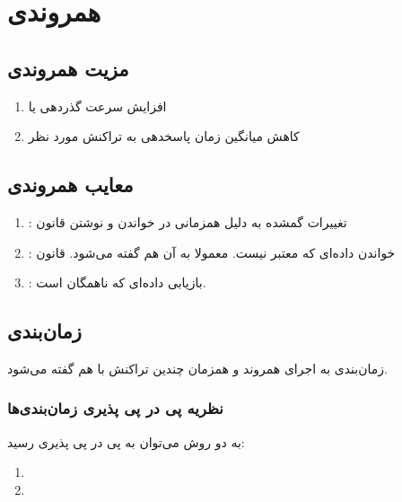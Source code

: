 \section{همروندی}

\subsection{مزیت همروندی}

\begin{enumerate}
    \item افزایش سرعت گذردهی یا 
    \item کاهش میانگین زمان پاسخدهی به تراکنش مورد نظر
\end{enumerate}

\subsection{معایب همروندی} 

\begin{enumerate}
    \item {}: تغییرات گمشده به دلیل همزمانی در خواندن و نوشتن
    قانون 
    \item {}: خواندن داده‌ای که معتبر نیست. معمولا به آن  هم گفته می‌شود. قانون 
    \item {}: بازیابی داده‌ای که ناهمگان است. 
\end{enumerate}

\subsection{زمان‌بندی}

زمان‌بندی به اجرای همروند و همزمان چندین تراکنش با هم گفته می‌شود.

\subsubsection{نظریه پی در پی پذیری زمان‌بندی‌ها}

به دو روش می‌توان به پی در پی پذیری رسید:

\begin{enumerate}
    \item {}
    \item {}
\end{enumerate}

